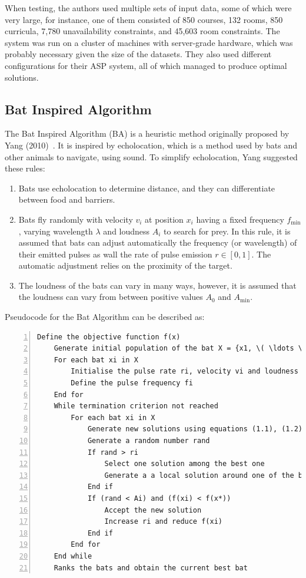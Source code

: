 \documentclass[a4paper, 12pt]{report}
\begin{document}
When testing, the authors used multiple sets of input data, some of which were 
very large, for instance, one of them consisted of 850 courses, 132 rooms, 850 
curricula, 7,780 unavailability constraints, and 45,603 room constraints.
The system was run on a cluster of machines with server-grade hardware, which 
was probably necessary given the size of the datasets.
They also used different configurations for their ASP system, all of which 
managed to produce optimal solutions.

\subsection{Bat Inspired Algorithm}

The Bat Inspired Algorithm (BA) is a heuristic method originally proposed by 
Yang (2010)~\cite{yang_bat}.
It is inspired by echolocation, which is a method used by bats and other animals
to navigate, using sound.
To simplify echolocation, Yang suggested these rules:
\begin{enumerate}
	\item Bats use echolocation to determine distance, and they can
		differentiate between food and barriers.
	\item Bats fly randomly with velocity \( v_i \) at position \( x_i \) having
		a fixed frequency \( f_{\min} \), varying wavelength \( \lambda \) and 
		loudness \( A_i \) to search for prey.
		In this rule, it is assumed that bats can adjust automatically the
		frequency (or wavelength) of their emitted pulses as wall the rate of
		pulse emission \( r \in [0,1] \).
		The automatic adjustment relies on the proximity of the target.
	\item The loudness of the bats can vary in many ways, however, it is assumed
		that the loudness can vary from between positive values \( A_0 \) and 
		\( A_{\min} \).
\end{enumerate}
Pseudocode for the Bat Algorithm can be described as:
\begin{Verbatim}[numbers=left, fontsize=\footnotesize]
	Define the objective function f(x)
	Generate initial population of the bat X = {x1, \( \ldots \), xn}
	For each bat xi in X
	    Initialise the pulse rate ri, velocity vi and loudness Ai
	    Define the pulse frequency fi
	End for
	While termination criterion not reached
	    For each bat xi in X
	        Generate new solutions using equations (1.1), (1.2) and (1.3)
	        Generate a random number rand
	        If rand > ri
	            Select one solution among the best one
	            Generate a a local solution around one of the best
	        End if
	        If (rand < Ai) and (f(xi) < f(x*))
	            Accept the new solution
	            Increase ri and reduce f(xi)
	        End if
	    End for
	End while
	Ranks the bats and obtain the current best bat
\end{Verbatim}
~\cite{ba_example}
\end{document}
